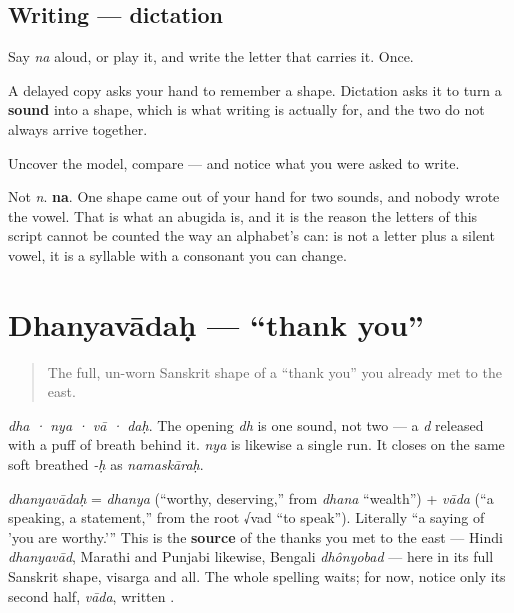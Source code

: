 \subsection*{Writing — dictation}
Say \emph{na} aloud, or play it, and write the letter that carries it. Once.

A delayed copy asks your hand to remember a shape. Dictation asks it to turn a \textbf{sound} into a shape, which is what writing is actually for, and the two do not always arrive together.

\begin{tcolorbox}[breakable,colback=teal!4,colframe=teal!35!black,title={Before you move on}]
Uncover the model, compare — and notice what you were asked to write.

Not \emph{n}. \textbf{na}. One shape came out of your hand for two sounds, and nobody wrote the vowel. That is what an abugida is, and it is the reason the letters of this script cannot be counted the way an alphabet's can: \textbf{} is not a letter plus a silent vowel, it is a syllable with a consonant you can change.
\end{tcolorbox}
\section[\texorpdfstring{\sk{धन्यवादः} (dhanyavādaḥ)}{धन्यवादः (dhanyavādaḥ)}]{Dhanyavādaḥ — \textquotedblleft{}thank you\textquotedblright{}}

\label{lesson:SA-C01-dhanyavada}



\begin{quote}
The full, un-worn Sanskrit shape of a \textquotedblleft{}thank you\textquotedblright{} you already met to the east.
\end{quote}

\begin{sounds}
\emph{dha · nya · vā · daḥ}. The opening \emph{dh} is one sound, not two — a \emph{d} released with a puff of breath behind it. \emph{nya} is likewise a single run. It closes on the same soft breathed \emph{-ḥ} as \emph{namaskāraḥ}.
\end{sounds}

\begin{cousinweb}
\emph{dhanyavādaḥ} = \emph{dhanya} (\textquotedblleft{}worthy, deserving,\textquotedblright{} from \emph{dhana} \textquotedblleft{}wealth\textquotedblright{}) + \emph{vāda} (\textquotedblleft{}a speaking, a statement,\textquotedblright{} from the root √vad \textquotedblleft{}to speak\textquotedblright{}). Literally \textquotedblleft{}a saying of 'you are worthy.'\textquotedblright{} This is the \textbf{source} of the thanks you met to the east — Hindi \emph{dhanyavād}, Marathi and Punjabi likewise, Bengali \emph{dhônyobad} — here in its full Sanskrit shape, visarga and all. The whole spelling waits; for now, notice only its second half, \emph{vāda}, written \textbf{}.
\end{cousinweb}

